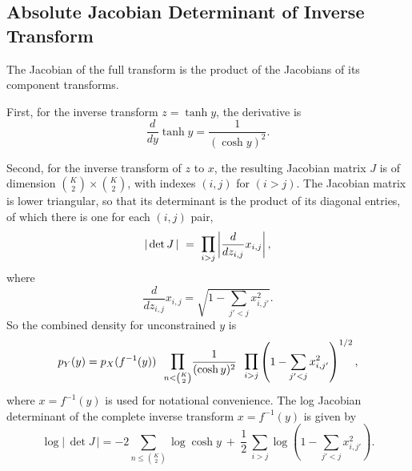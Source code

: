 \subsection{Absolute Jacobian Determinant of Inverse Transform}

The Jacobian of the full transform is the product of the Jacobians of
its component transforms.

First, for the inverse transform $z = \tanh y$, the derivative is
%
\[
\frac{d}{dy} \tanh y = \frac{1}{(\cosh y)^2}.
\]
%

Second, for the inverse transform of $z$ to $x$, the resulting
Jacobian matrix $J$ is of dimension $\binom{K}{2} \times
\binom{K}{2}$, with indexes $(i,j)$ for $(i > j)$.  The Jacobian
matrix is lower triangular, so that its determinant is the product of
its diagonal entries, of which there is one for each $(i,j)$ pair,
%
\[
\left| \, \mbox{det} \, J \, \right|
  \ = \ \mathlarger{\prod}_{i > j} \left| \frac{d}{dz_{i,j}} x_{i,j} \right|,
\]
%
where
%
\[
\frac{d}{dz_{i,j}} x_{i,j}
= \sqrt{1 - \sum_{j' < j} x^2_{i,j'}}.
\]
%
So the combined density for unconstrained $y$ is 
\[
p_Y(y) 
= p_X(f^{-1}(y)) 
  \ \
  \mathlarger{\prod}_{n < \binom{K}{2}} \frac{1}{(\cosh y)^2}
  \ \
  \mathlarger{\prod}_{i > j} \left( 1 - \sum_{j' < j} x_{i,j'}^2
  \right)^{1/2},
\]
%
where $x = f^{-1}(y)$ is used for notational convenience.  The log
Jacobian determinant of the complete inverse transform $x = f^{-1}(y)$
is given by
\[
\log \left| \, \det J \, \right|
= 
-2 \sum_{n \leq \binom{K}{2}}
\log \cosh y
\
+
\
\frac{1}{2} \
\sum_{i > j}
\log \left( 1 - \sum_{j' < j} x_{i,j'}^2 \right)
.
\]



